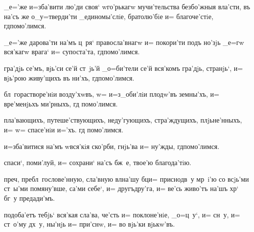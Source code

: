  _е='же и=зба'вити лю'ди своя` w\т го'рькагw 
мучи'тельства безбо'жныя вла'сти, въ на'съ же 
о_у=тверди'ти _единомы'слiе, братолю'бiе и= 
благоче'стiе, гд помо'лимся.


 _е='же дарова'ти на'мъ ц~ря` правосла'внагw и= 
покори'ти подъ но'зjь _е=гw вся'кагw врага` и= 
супоста'та, гд помо'лимся.


 гра'дjь се'мъ, \kinovarsimple{[и=ли`: W=} вjь'си се'й ст~jь'й 
_о=би'тели се'й\kinovarsimple{]} вся'комъ гра'дjь, странjь`, и= вjь'рою 
живу'щихъ въ ни'хъ, гд помо'лимся.


 бл~горастворе'нiи возду'хwвъ, w= и=з\ъ_оби'лiи 
плодw'въ земны'хъ, и= вре'менjьхъ ми'рныхъ, гд 
помо'лимся.


 пла'вающихъ, путеше'ствующихъ, неду'гующихъ, 
стра'ждущихъ, плjьне'нныхъ, и= w= спасе'нiи и='хъ. гд 
помо'лимся.


 и=зба'витися на'мъ w\т вся'кiя ско'рби, гнjь'ва и= 
ну'жды, гд помо'лимся.


 спаси`, поми'луй, и= сохрани` на'съ бж~е, 
твое'ю благода'тiю.


 преч, пребл~гослове'нную, сла'вную 
вл на'шу бц и= приснодв~у мр~i'ю со всjь'ми 
ст~ы'ми помяну'вше, са'ми себе`, и= другъдру'га, и= ве'сь 
живо'тъ на'шъ хр` бг~у предади'мъ.



 подоба'етъ тебjь` вся'кая сла'ва, че'сть и= 
поклоне'нiе, _о=ц~у`, и= сн~у, и= ст~о'му дх~у, ны'нjь и= 
при'снw, и= во вjь'ки вjькw'въ.

